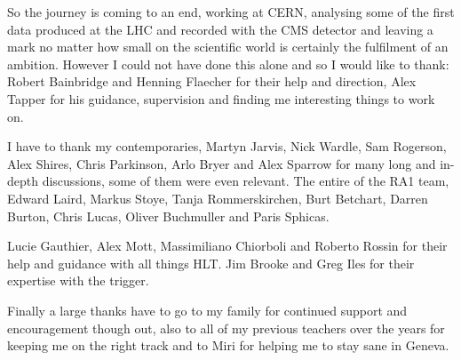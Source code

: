 \begin{acknowledgements}
So the journey is coming to an end, working at CERN, analysing some of the 
first data produced at the LHC and recorded with the CMS detector and leaving 
a mark no matter how small on the scientific world is certainly the fulfilment 
of an ambition. However I could not have done this alone and so I would like to 
thank: Robert Bainbridge and Henning Flaecher for their help and direction, 
Alex Tapper for his guidance, supervision and finding me interesting things to 
work on.

I have to thank my contemporaries, Martyn Jarvis, Nick Wardle, Sam Rogerson, 
Alex Shires, Chris Parkinson, Arlo Bryer and Alex Sparrow for many long and 
in-depth discussions, some of them were even relevant. The entire of the RA1 
team, Edward Laird, Markus Stoye, Tanja Rommerskirchen, Burt Betchart, Darren 
Burton, Chris Lucas, Oliver Buchmuller and Paris Sphicas.

Lucie Gauthier, Alex Mott, Massimiliano Chiorboli and Roberto Rossin for their 
help and guidance with all things HLT. Jim Brooke and Greg Iles for their 
expertise with the \Lone trigger.

Finally a large thanks have to go to my family for continued support and 
encouragement though out, also to all of my previous teachers over the years for keeping me on the right track and to Miri for helping me to stay sane in Geneva. 

\end{acknowledgements}

